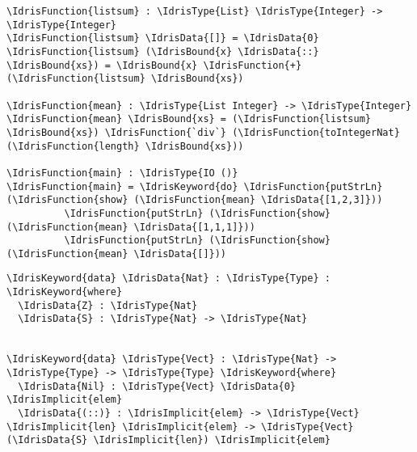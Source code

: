 \documentclass[xetex,xcolor={usenames,dvipsnames},mathserif,serif,17pt]{beamer}
\newcommand{\IdrisData}[1]{\textcolor{red}{#1}}
\newcommand{\IdrisType}[1]{\textcolor{blue}{#1}}
\newcommand{\IdrisBound}[1]{\textcolor{violet}{#1}}
\newcommand{\IdrisFunction}[1]{\textcolor{OliveGreen}{#1}}
\newcommand{\IdrisKeyword}[1]{{\underline{#1}}}
\newcommand{\IdrisImplicit}[1]{{\itshape \IdrisBound{#1}}}
\begin{document}
\begin{frame}[fragile]
\begin{Verbatim}[commandchars=\\\{\}]
\IdrisFunction{listsum} : \IdrisType{List} \IdrisType{Integer} -> \IdrisType{Integer}
\IdrisFunction{listsum} \IdrisData{[]} = \IdrisData{0}
\IdrisFunction{listsum} (\IdrisBound{x} \IdrisData{::} \IdrisBound{xs}) = \IdrisBound{x} \IdrisFunction{+} (\IdrisFunction{listsum} \IdrisBound{xs})

\IdrisFunction{mean} : \IdrisType{List Integer} -> \IdrisType{Integer}
\IdrisFunction{mean} \IdrisBound{xs} = (\IdrisFunction{listsum} \IdrisBound{xs}) \IdrisFunction{`div`} (\IdrisFunction{toIntegerNat} (\IdrisFunction{length} \IdrisBound{xs}))

\IdrisFunction{main} : \IdrisType{IO ()}
\IdrisFunction{main} = \IdrisKeyword{do} \IdrisFunction{putStrLn} (\IdrisFunction{show} (\IdrisFunction{mean} \IdrisData{[1,2,3]}))
          \IdrisFunction{putStrLn} (\IdrisFunction{show} (\IdrisFunction{mean} \IdrisData{[1,1,1]}))
          \IdrisFunction{putStrLn} (\IdrisFunction{show} (\IdrisFunction{mean} \IdrisData{[]}))
\end{Verbatim}
\end{frame}

\begin{frame}[fragile]
\begin{Verbatim}[commandchars=\\\{\}]
\IdrisKeyword{data} \IdrisData{Nat} : \IdrisType{Type} : \IdrisKeyword{where}
  \IdrisData{Z} : \IdrisType{Nat}
  \IdrisData{S} : \IdrisType{Nat} -> \IdrisType{Nat}

  
\IdrisKeyword{data} \IdrisType{Vect} : \IdrisType{Nat} -> \IdrisType{Type} -> \IdrisType{Type} \IdrisKeyword{where}
  \IdrisData{Nil} : \IdrisType{Vect} \IdrisData{0} \IdrisImplicit{elem}
  \IdrisData{(::)} : \IdrisImplicit{elem} -> \IdrisType{Vect} \IdrisImplicit{len} \IdrisImplicit{elem} -> \IdrisType{Vect} (\IdrisData{S} \IdrisImplicit{len}) \IdrisImplicit{elem}
\end{Verbatim}
\end{frame}
\end{document}
